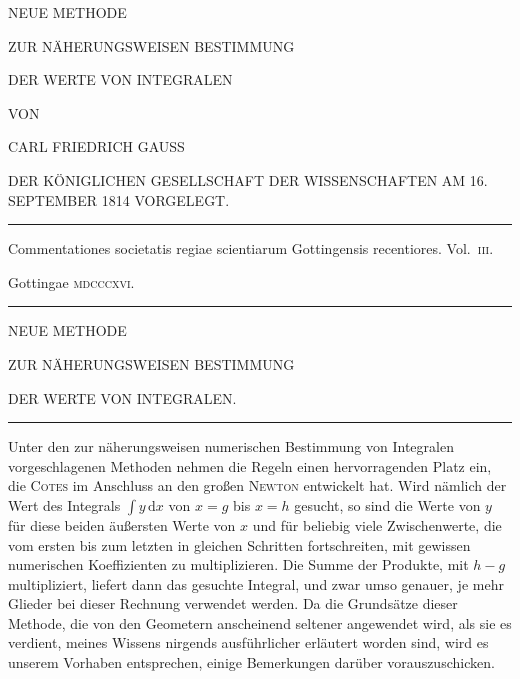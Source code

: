\clearpage{}\thispagestyle{empty}
\begin{center}
NEUE METHODE

\medskip
ZUR NÄHERUNGSWEISEN BESTIMMUNG

DER WERTE VON INTEGRALEN

VON

CARL FRIEDRICH GAUSS

DER KÖNIGLICHEN GESELLSCHAFT DER WISSENSCHAFTEN AM 16. SEPTEMBER 1814 VORGELEGT.

\par\bigskip\rule{.7\linewidth}{.4pt}\par\medskip
Commentationes societatis regiae scientiarum Gottingensis recentiores. Vol.~\textsc{iii}.

Gottingae \textsc{mdcccxvi}.
\par\medskip\rule{.7\linewidth}{.4pt}
\end{center}
\clearpage{}
\begin{center}
NEUE METHODE

ZUR NÄHERUNGSWEISEN BESTIMMUNG

DER WERTE VON INTEGRALEN.

\medskip\rule{.1\linewidth}{.4pt}
\end{center}
Unter den zur näherungsweisen numerischen Bestimmung von Integralen vorgeschlagenen Methoden nehmen die Regeln einen hervorragenden Platz ein, die \textsc{Cotes} im Anschluss an den großen \textsc{Newton} entwickelt hat. Wird nämlich der Wert des Integrals $\int y\,\mathrm{d}x$ von $x=g$ bis $x=h$ gesucht, so sind die Werte von $y$ für diese beiden äußersten Werte von $x$ und für beliebig viele Zwischenwerte, die vom ersten bis zum letzten in gleichen Schritten fortschreiten, mit gewissen numerischen Koeffizienten zu multiplizieren. Die Summe der Produkte, mit $h-g$ multipliziert, liefert dann das gesuchte Integral, und zwar umso genauer, je mehr Glieder bei dieser Rechnung verwendet werden. Da die Grundsätze dieser Methode, die von den Geometern anscheinend seltener angewendet wird, als sie es verdient, meines Wissens nirgends ausführlicher erläutert worden sind, wird es unserem Vorhaben entsprechen, einige Bemerkungen darüber vorauszuschicken.

